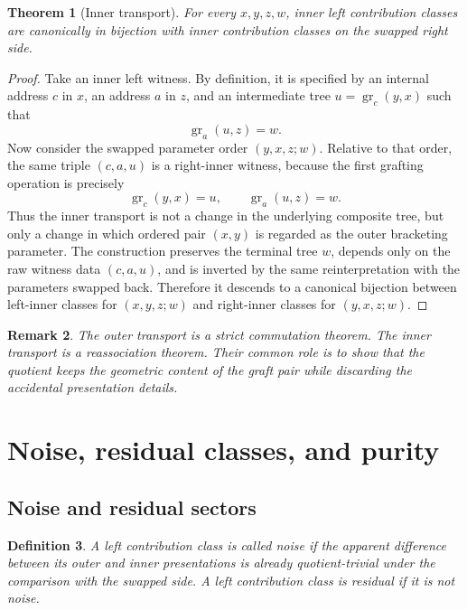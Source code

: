\documentclass[11pt]{article}
\newtheorem{theorem}{Theorem}
\newtheorem{definition}[theorem]{Definition}
\newtheorem{remark}[theorem]{Remark}
\newcommand{\graftat}[3]{\operatorname{gr}_{#2}(#3,#1)}
\begin{document}
\begin{theorem}[Inner transport]
For every \(x,y,z,w\), inner left contribution classes are canonically in
bijection with inner contribution classes on the swapped right side.
\end{theorem}

\begin{proof}
Take an inner left witness. By definition, it is specified by an internal
address \(c\) in \(x\), an address \(a\) in \(z\), and an intermediate tree
\(u=\graftat{x}{c}{y}\) such that
\[
\graftat{z}{a}{u}=w.
\]
Now consider the swapped parameter order \((y,x,z;w)\). Relative to that order,
the same triple \((c,a,u)\) is a right-inner witness, because the first
grafting operation is precisely
\[
\graftat{x}{c}{y}=u,
\qquad
\graftat{z}{a}{u}=w.
\]
Thus the inner transport is not a change in the underlying composite tree, but
only a change in which ordered pair \((x,y)\) is regarded as the outer
bracketing parameter. The construction preserves the terminal tree \(w\),
depends only on the raw witness data \((c,a,u)\), and is inverted by the same
reinterpretation with the parameters swapped back. Therefore it descends to a
canonical bijection between left-inner classes for \((x,y,z;w)\) and
right-inner classes for \((y,x,z;w)\).
\end{proof}

\begin{remark}
The outer transport is a strict commutation theorem. The inner transport is a
reassociation theorem. Their common role is to show that the quotient keeps the
geometric content of the graft pair while discarding the accidental
presentation details.
\end{remark}

\section{Noise, residual classes, and purity}

\subsection{Noise and residual sectors}

\begin{definition}
A left contribution class is called \emph{noise} if the apparent difference
between its outer and inner presentations is already quotient-trivial under the
comparison with the swapped side. A left contribution class is
\emph{residual} if it is not noise.
\end{definition}
\end{document}
